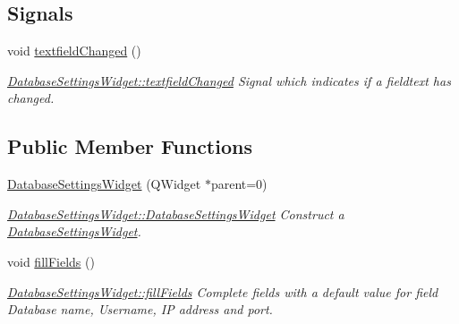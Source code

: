 \subsection*{Signals}
\begin{DoxyCompactItemize}
\item 
\hypertarget{classGui_1_1Widgets_1_1DatabaseSettingsWidget_a6947626c7bb6807572e0a49ef2f53c70}{void \hyperlink{classGui_1_1Widgets_1_1DatabaseSettingsWidget_a6947626c7bb6807572e0a49ef2f53c70}{textfield\-Changed} ()}\label{classGui_1_1Widgets_1_1DatabaseSettingsWidget_a6947626c7bb6807572e0a49ef2f53c70}

\begin{DoxyCompactList}\small\item\em \hyperlink{classGui_1_1Widgets_1_1DatabaseSettingsWidget_a6947626c7bb6807572e0a49ef2f53c70}{Database\-Settings\-Widget\-::textfield\-Changed} Signal which indicates if a fieldtext has changed. \end{DoxyCompactList}\end{DoxyCompactItemize}
\subsection*{Public Member Functions}
\begin{DoxyCompactItemize}
\item 
\hyperlink{classGui_1_1Widgets_1_1DatabaseSettingsWidget_a723805fcd8e71878c6d66b7296f16d85}{Database\-Settings\-Widget} (Q\-Widget $\ast$parent=0)
\begin{DoxyCompactList}\small\item\em \hyperlink{classGui_1_1Widgets_1_1DatabaseSettingsWidget_a723805fcd8e71878c6d66b7296f16d85}{Database\-Settings\-Widget\-::\-Database\-Settings\-Widget} Construct a \hyperlink{classGui_1_1Widgets_1_1DatabaseSettingsWidget}{Database\-Settings\-Widget}. \end{DoxyCompactList}\item 
\hypertarget{classGui_1_1Widgets_1_1DatabaseSettingsWidget_a79e2fb995dbd14f4c4d0b54bdfaf5d5f}{void \hyperlink{classGui_1_1Widgets_1_1DatabaseSettingsWidget_a79e2fb995dbd14f4c4d0b54bdfaf5d5f}{fill\-Fields} ()}\label{classGui_1_1Widgets_1_1DatabaseSettingsWidget_a79e2fb995dbd14f4c4d0b54bdfaf5d5f}

\begin{DoxyCompactList}\small\item\em \hyperlink{classGui_1_1Widgets_1_1DatabaseSettingsWidget_a79e2fb995dbd14f4c4d0b54bdfaf5d5f}{Database\-Settings\-Widget\-::fill\-Fields} Complete fields with a default value for field Database name, Username, I\-P address and port. \end{DoxyCompactList}\end{DoxyCompactItemize}


